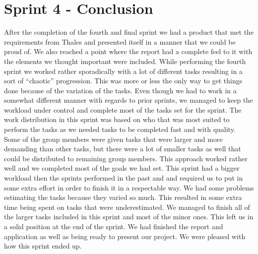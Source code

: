 \section{Sprint 4 - Conclusion}
After the completion of the fourth and final sprint we had a product that met the requirements from Thales and presented itself in a manner that we could be proud of. We also reached a point where the report had a complete feel to it with the elements we thought important were included. 
\newline
\newline
While performing the fourth sprint we worked rather sporadically with a lot of different tasks resulting in a sort of “chaotic” progression. This was more or less the only way to get things done because of the variation of the tasks. Even though we had to work in a somewhat different manner with regards to prior sprints, we managed to keep the workload under control and complete most of the tasks set for the sprint. The work distribution in this sprint was based on who that was most suited to perform the tasks as we needed tasks to be completed fast and with quality. Some of the group members were given tasks that were larger and more demanding than other tasks, but there were a lot of smaller tasks as well that could be distributed to remaining group members. This approach worked rather well and we completed most of the goals we had set.
\newline
\newline
This sprint had a bigger workload then the sprints performed in the past and and required us to put in some extra effort in order to finish it in a respectable way. We had some problems estimating the tasks because they varied so much. This resulted in some extra time being spent on tasks that were underestimated. We managed to finish all of the larger tasks included in this sprint and most of the minor ones. This left us in a solid position at the end of the sprint. We had finished the report and application as well as being ready to present our project. We were pleased with how this sprint ended up.    



